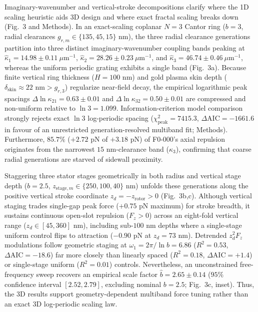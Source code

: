 \documentclass[11pt, a4paper]{article}
\begin{document}
Imaginary-wavenumber and vertical-stroke decompositions clarify where the 1D scaling heuristic aids 3D design and where exact fractal scaling breaks down (Fig.~3 and Methods). In an exact-scaling coplanar $N=3$ Cantor ring ($b=3$, radial clearances $g_{r,m} \in \{135, 45, 15\}\text{ nm}$), the three radial clearance generations partition into three distinct imaginary-wavenumber coupling bands peaking at $\hat{\kappa}_1 = 14.98 \pm 0.11\ \mu\text{m}^{-1}$, $\hat{\kappa}_2 = 28.26 \pm 0.23\ \mu\text{m}^{-1}$, and $\hat{\kappa}_3 = 46.74 \pm 0.46\ \mu\text{m}^{-1}$, whereas the uniform periodic grating exhibits a single band (Fig.~3a). Because finite vertical ring thickness ($H = 100\text{ nm}$) and gold plasma skin depth ($\delta_{\mathrm{skin}} \approx 22\text{ nm} > g_{r,3}$) regularize near-field decay, the empirical logarithmic peak spacings $\Delta\ln\kappa_{21} = 0.63 \pm 0.01$ and $\Delta\ln\kappa_{32} = 0.50 \pm 0.01$ are compressed and non-uniform relative to $\ln 3 = 1.099$. Information-criterion model comparison strongly rejects exact $\ln 3$ log-periodic spacing ($\chi^2_{\mathrm{peak}} = 7415.3$, $\Delta\mathrm{AIC} = -1661.6$ in favour of an unrestricted generation-resolved multiband fit; Methods). Furthermore, $85.7\%$ ($+2.72\text{ pN}$ of $+3.18\text{ pN}$) of F0-000's axial repulsion originates from the narrowest $15\text{ nm}$-clearance band ($\kappa_3$), confirming that coarse radial generations are starved of sidewall proximity.

Staggering three stator stages geometrically in both radius and vertical stage depth ($b=2.5$, $z_{\mathrm{stage},m} \in \{250, 100, 40\}\text{ nm}$) unfolds these generations along the positive vertical stroke coordinate $z_d = -z_{\mathrm{rotor}} > 0$ (Fig.~3b,c). Although vertical staging trades single-gap peak force ($+0.75\text{ pN}$ maximum) for stroke breadth, it sustains continuous open-slot repulsion ($F_z > 0$) across an eight-fold vertical range ($z_d \in [45, 360]\text{ nm}$), including sub-$100\text{ nm}$ depths where a single-stage uniform control flips to attraction ($-0.90\text{ pN}$ at $z_d = 73\text{ nm}$). Detrended $z_d^2 F_z$ modulations follow geometric staging at $\omega_1 = 2\pi/\ln b = 6.86$ ($R^2 = 0.53$, $\Delta\mathrm{AIC} = -18.6$) far more closely than linearly spaced ($R^2 = 0.18$, $\Delta\mathrm{AIC} = +1.4$) or single-stage uniform ($R^2 = 0.01$) controls. Nevertheless, an unconstrained free-frequency sweep recovers an empirical scale factor $\hat{b} = 2.65 \pm 0.14$ ($95\%$ confidence interval $[2.52, 2.79]$, excluding nominal $b=2.5$; Fig.~3c, inset). Thus, the 3D results support geometry-dependent multiband force tuning rather than an exact 3D log-periodic scaling law.
\end{document}

